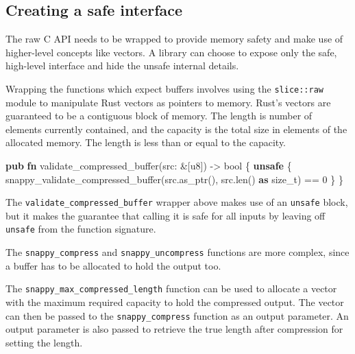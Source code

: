 \documentclass[a4paper,]{book}
\newenvironment{Shaded}{\begin{snugshade}}{\end{snugshade}}
\newcommand{\KeywordTok}[1]{\textcolor[rgb]{0.13,0.29,0.53}{\textbf{{#1}}}}
\newcommand{\DataTypeTok}[1]{\textcolor[rgb]{0.13,0.29,0.53}{{#1}}}
\newcommand{\DecValTok}[1]{\textcolor[rgb]{0.00,0.00,0.81}{{#1}}}
\newcommand{\NormalTok}[1]{{#1}}
\begin{document}
\subsection{Creating a safe interface}\label{creating-a-safe-interface}

The raw C API needs to be wrapped to provide memory safety and make use
of higher-level concepts like vectors. A library can choose to expose
only the safe, high-level interface and hide the unsafe internal
details.

Wrapping the functions which expect buffers involves using the
\texttt{slice::raw} module to manipulate Rust vectors as pointers to
memory. Rust's vectors are guaranteed to be a contiguous block of
memory. The length is number of elements currently contained, and the
capacity is the total size in elements of the allocated memory. The
length is less than or equal to the capacity.

\begin{Shaded}
\begin{Highlighting}[]
\KeywordTok{pub} \KeywordTok{fn} \NormalTok{validate_compressed_buffer(src: &[}\DataTypeTok{u8}\NormalTok{]) -> }\DataTypeTok{bool} \NormalTok{\{}
    \KeywordTok{unsafe} \NormalTok{\{}
        \NormalTok{snappy_validate_compressed_buffer(src.as_ptr(), src.len() }\KeywordTok{as} \DataTypeTok{size_t}\NormalTok{) == }\DecValTok{0}
    \NormalTok{\}}
\NormalTok{\}}
\end{Highlighting}
\end{Shaded}

The \texttt{validate\_compressed\_buffer} wrapper above makes use of an
\texttt{unsafe} block, but it makes the guarantee that calling it is
safe for all inputs by leaving off \texttt{unsafe} from the function
signature.

The \texttt{snappy\_compress} and \texttt{snappy\_uncompress} functions
are more complex, since a buffer has to be allocated to hold the output
too.

The \texttt{snappy\_max\_compressed\_length} function can be used to
allocate a vector with the maximum required capacity to hold the
compressed output. The vector can then be passed to the
\texttt{snappy\_compress} function as an output parameter. An output
parameter is also passed to retrieve the true length after compression
for setting the length.
\end{document}
